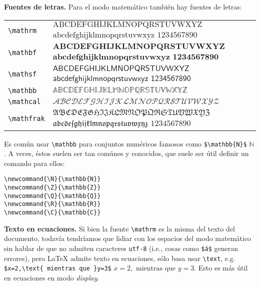 \textbf{Fuentes de letras.} Para el modo matemático también hay fuentes de letras:
\begin{center}
	\begin{longtable}{lp{8cm}}
		\hline \hline
		\lstinline|\mathrm|   & $\mathrm{ABCDEFGHIJKLMNOPQRSTUVWXYZ}$ $\mathrm{abcdefghijklmnopqrstuvwxyz}$ $\mathrm{1234567890}$ \\
		\lstinline|\mathbf|   & $\mathbf{ABCDEFGHIJKLMNOPQRSTUVWXYZ}$ $\mathbf{abcdefghijklmnopqrstuvwxyz}$ $\mathbf{1234567890}$ \\
		\lstinline|\mathsf|   & $\mathsf{ABCDEFGHIJKLMNOPQRSTUVWXYZ}$ $\mathsf{abcdefghijklmnopqrstuvwxyz}$ $\mathsf{1234567890}$ \\
		\lstinline|\mathbb|   & $\mathbb{ABCDEFGHIJKLMNOPQRSTUVWXYZ}$ \\
		\lstinline|\mathcal|  & $\mathcal{ABCDEFGHIJKLMNOPQRSTUVWXYZ}$ \\
		\lstinline|\mathfrak| & $\mathfrak{ABCDEFGHIJKLMNOPQRSTUVWXYZ}$ $\mathfrak{abcdefghijklmnopqrstuvwxyz}$ $\mathfrak{1234567890}$ \\
		\hline \hline
	\end{longtable}
\end{center}
Es común usar \lstinline|\mathbb| para conjuntos numéricos famosos como \lstinline|$\mathbb{N}$| $\mathbb{N}$. A veces, éstos suelen ser tan comúnes y conocidos, que suele ser útil definir un comando para ellos:
\begin{lstlisting}
\newcommand{\N}{\mathbb{N}}
\newcommand{\Z}{\mathbb{Z}}
\newcommand{\Q}{\mathbb{Q}}
\newcommand{\R}{\mathbb{R}}
\newcommand{\C}{\mathbb{C}}
\end{lstlisting}
\textbf{Texto en ecuaciones.} Si bien la fuente \lstinline|\mathrm| es la misma del texto del documento, todavía tendríamos que lidiar con los espacios del modo matemático sin hablar de que no admiten caracteres \texttt{utf-8} (i.e., cosas como \lstinline|$á$| generan errores), pero \LaTeX{} admite texto en ecuaciones, sólo basa usar \lstinline|\text|, e.g. \lstinline|$x=2,\text{ mientras que }y=3$| $x=2,\text{ mientras que }y=3$. Esto es más útil en ecuaciones en modo \textit{display}.

